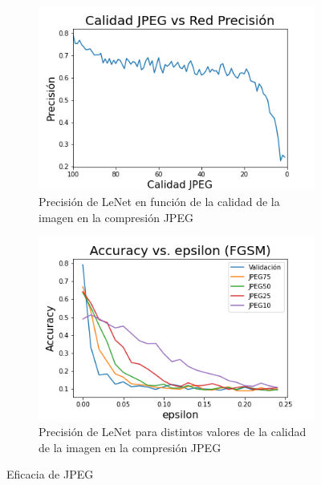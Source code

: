 \begin{figure}[h!]
    \centering
    \begin{subfigure}[b]{0.48\textwidth}
        \centering
        \includegraphics[width=\textwidth]{images/cifar-10/cifar_JPEG_accuracy.png}
        \caption{Precisión de LeNet en función de la calidad de la imagen en la compresión JPEG}
        \label{cifar_accuracy_epsilon}
    \end{subfigure}
    \hspace{4mm}
    \begin{subfigure}[b]{0.48\textwidth}
        \centering
        \includegraphics[width=\textwidth]{images/cifar-10/cifar_epsilon_accuracy.png}
        \caption{Precisión de LeNet para distintos valores de la calidad de la imagen en la compresión JPEG}
        \label{cifar_jpeg_accuracy}
    \end{subfigure}

    \caption{Eficacia de JPEG}
    \label{cifrar_accuracy}
\end{figure}



